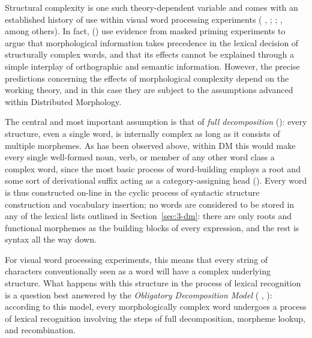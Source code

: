 Structural complexity is one such theory-dependent variable and comes with an established history of use within visual word processing experiments (\citeauthor{Taft+1979} \citeyear{Taft+1979}, \citeyear{Taft+2004}; \citeauthor{Rastle+etal+2004} \citeyear{Rastle+etal+2004}; \citeauthor{Stockall+Marantz2006} \citeyear{Stockall+Marantz2006}, among others). In fact, \citeauthor{Rastle+etal+2004} (\citeyear{Rastle+etal+2004}) use evidence from masked priming experiments to argue that morphological information takes precedence in the lexical decision of structurally complex words, and that its effects cannot be explained through a simple interplay of orthographic and semantic information. However, the precise predictions concerning the effects of morphological complexity depend on the working theory, and in this case they are subject to the assumptions advanced within Distributed Morphology. 

The central and most important assumption is that of \textit{full decomposition} (\cite{Embick+2015}): every structure, even a single word, is internally complex as long as it consists of multiple morphemes. As has been observed above, within DM this would make every single well-formed noun, verb, or member of any other word class a complex word, since the most basic process of word-building employs a root and some sort of derivational suffix acting as a category-assigning head (\cite{Embick+2015}). Every word is thus constructed on-line in the cyclic process of syntactic structure construction and vocabulary insertion; no words are considered to be stored in any of the lexical lists outlined in Section~\ref{sec:3-dm}: there are only roots and functional morphemes as the building blocks of every expression, and the rest is syntax all the way down.

For visual word processing experiments, this means that every string of characters conventionally seen as a word will have a complex underlying structure. What happens with this structure in the process of lexical recognition is a question best answered by the \textit{Obligatory Decomposition Model} (\citeauthor{Taft+1979} \citeyear{Taft+1979}, \citeauthor{Taft+2004} \citeyear{Taft+2004}): according to this model, every morphologically complex word undergoes a process of lexical recognition involving the steps of full decomposition, morpheme lookup, and recombination. 

